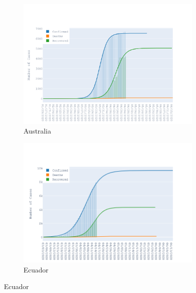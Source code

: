 \documentclass{homework}
\begin{document}
\begin{figure}[H]
  \centering
  \begin{subfigure}{0.45\linewidth}
    \includegraphics[width=\linewidth]{task2/Australia.png}
    \caption{Australia}
  \end{subfigure}
  \hfil
  \begin{subfigure}{0.45\linewidth}
    \includegraphics[width=\linewidth]{task2/Chile.png}
    \caption{Ecuador}
  \end{subfigure}


\end{figure}
\end{document}
